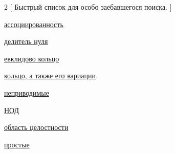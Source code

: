 \documentclass[a4paper,100pt]{article}
\theoremstyle{indented}
\theoremstyle{definition}
\theoremstyle{remark}
\begin{document}
\begin{multicols}{2}
    [
    Быстрый список для особо заебавшегося поиска.
    ]

    \hyperlink{n4}{ассоциированность}\
    
    \hyperlink{n3}{делитель нуля}\

    \hyperlink{n5}{евклидово кольцо}\
    
    \hyperlink{n1}{кольцо, а также его вариации}\

    \hyperlink{n7}{неприводимые}\

    \hyperlink{n6}{НОД}\

    \hyperlink{n2}{область целостности}\

    \hyperlink{n8}{простые}\ 
    

\end{multicols}
\end{document}
